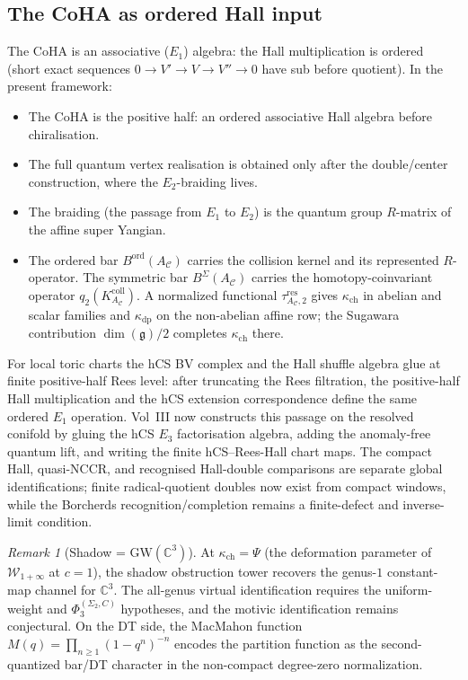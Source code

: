 \documentclass[11pt]{article}
\theoremstyle{plain}
\theoremstyle{definition}
\theoremstyle{remark}
\newtheorem{remark}[theorem]{Remark}
\newcommand{\fg}{\mathfrak{g}}
\newcommand{\cC}{\mathcal{C}}
\newcommand{\cW}{\mathcal{W}}
\newcommand{\bC}{\mathbb{C}}
\newcommand{\Eone}{E_1}
\newcommand{\Etwo}{E_2}
\newcommand{\GW}{\mathrm{GW}}
\begin{document}
\subsection{The CoHA as ordered Hall input}

The CoHA is an associative ($\Eone$) algebra: the Hall
multiplication is ordered (short exact sequences
$0 \to V' \to V \to V'' \to 0$ have sub before quotient).  In the
present framework:

\begin{itemize}
\item The CoHA is the positive half: an ordered associative Hall
 algebra before chiralisation.
 \item The full quantum vertex realisation is obtained only after the
 double/center construction, where the $\Etwo$-braiding lives.
 \item The braiding (the passage from $\Eone$ to $\Etwo$) is
 the quantum group $R$-matrix of the affine super Yangian.
 \item The ordered bar $B^{\mathrm{ord}}(A_\cC)$ carries the
 collision kernel and its represented $R$-operator.  The symmetric
 bar $B^\Sigma(A_\cC)$ carries the homotopy-coinvariant operator
 $q_2(K_{A_\cC}^{\mathrm{coll}})$.  A normalized functional
 $\tau_{A_\cC,2}^{\mathrm{res}}$ gives $\kappa_{\mathrm{ch}}$ in
 abelian and scalar families and $\kappa_{\mathrm{dp}}$ on the
 non-abelian affine row; the Sugawara contribution $\dim(\fg)/2$
 completes $\kappa_{\mathrm{ch}}$ there.
\end{itemize}

For local toric charts the hCS BV complex and the Hall shuffle algebra
glue at finite positive-half Rees level: after truncating the Rees
filtration, the positive-half Hall multiplication and the hCS extension
correspondence define the same ordered $\Eone$ operation.  Vol~III now
constructs this passage on the resolved conifold by gluing the hCS
$E_3$ factorisation algebra, adding the anomaly-free quantum lift, and
writing the finite hCS--Rees-Hall chart maps.  The compact Hall,
quasi-NCCR, and recognised Hall-double comparisons are separate global
identifications; finite radical-quotient doubles now exist from compact
windows, while the Borcherds recognition/completion remains a
finite-defect and inverse-limit condition.

\begin{remark}[Shadow = $\GW(\bC^3)$]
\label{rem:v3-st-shadow-gw}
At $\kappa_{\mathrm{ch}} = \Psi$ (the deformation parameter of
$\cW_{1+\infty}$ at $c = 1$), the shadow obstruction tower recovers
the genus-$1$ constant-map channel for $\bC^3$. The all-genus virtual
identification requires the uniform-weight and $\Phi_3^{(\Sigma_2,C)}$ hypotheses,
and the motivic identification remains conjectural. On the DT side,
the MacMahon function
$M(q) = \prod_{n \geq 1}(1 - q^n)^{-n}$ encodes the partition
function as the second-quantized bar/DT character in the non-compact
degree-zero normalization.
\end{remark}
\end{document}
